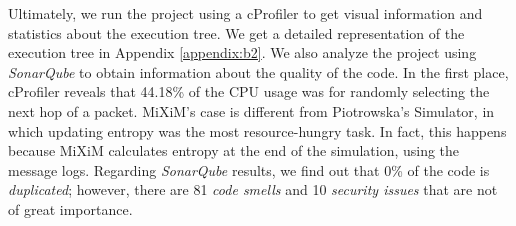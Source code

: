 \documentclass[logo,msc,cyber]{infthesis}   %
\begin{document}
Ultimately, we run the project using a cProfiler to get visual information and
statistics about the execution tree. We get a detailed representation of the
execution tree in Appendix \ref{appendix:b2}. We also analyze the project using
\emph{SonarQube} to obtain information about the quality of the code. In the first
place, cProfiler reveals that 44.18\% of the CPU usage was for randomly
selecting the next hop of a packet. MiXiM's case is different from Piotrowska's
Simulator, in which updating entropy was the most resource-hungry task. In fact,
this happens because MiXiM calculates entropy at the end of the simulation,
using the message logs. Regarding \emph{SonarQube} results, we find out that 0\%
of the code is \emph{duplicated}; however, there are 81 \emph{code smells} and
10 \emph{security issues} that are not of great importance.
\end{document}
